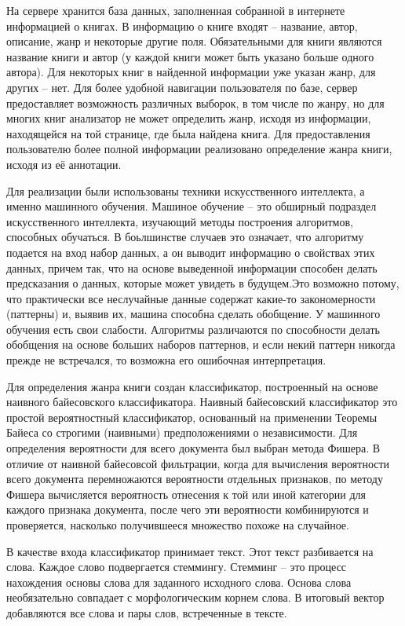 \documentclass[a4paper]{report}
\begin{document}
На сервере хранится база данных, заполненная собранной в интернете информацией о книгах. В информацию о книге входят -- название, автор, описание, жанр и некоторые другие поля. Обязательными для книги являются название книги и автор (у каждой книги может быть указано больше одного автора). Для некоторых книг в найденной информации уже указан жанр, для других -- нет. Для более удобной навигации пользователя по базе, сервер предоставляет возможность различных выборок, в том числе по жанру, но для многих книг анализатор не может определить жанр, исходя из информации, находящейся на той странице, где была найдена книга. Для предоставления пользователю более полной информации реализовано определение жанра книги, исходя из её аннотации. 

Для реализации были использованы техники искусственного интеллекта, а именно машинного обучения. Машиное обучение -- это обширный подраздел искусственного интеллекта, изучающий методы построения алгоритмов, способных обучаться. В боьлшинстве случаев это означает, что алгоритму подается на вход набор данных, а он выводит информацию о свойствах этих данных, причем так, что на основе выведенной информации способен делать предсказания о данных, которые может увидеть в будущем.Это возможно потому, что практически все неслучайные данные содержат какие-то закономерности (паттерны) и, выявив их, машина способна сделать обобщение. У машинного обучения есть свои слабости. Алгоритмы различаются по способности делать обобщения на основе больших наборов паттернов, и если некий паттерн никогда прежде не встречался, то возможна его ошибочная интерпретация.

Для определения жанра книги создан классификатор, построенный на основе наивного байесовского классификатора. Наивный байесовский классификатор это простой вероятностный классификатор, основанный на применении Теоремы Байеса со строгими (наивными) предположениями о независимости. Для определения вероятности для всего документа был выбран метода Фишера. 
В отличие от наивной байесовсой фильтрации, когда для вычисления вероятности всего документа перемножаются вероятности отдельных признаков, по методу Фишера вычисляется вероятность отнесения к той или иной категории для каждого признака документа, после чего эти вероятности комбинируются и проверяется, насколько получившееся множество похоже на случайное.

В качестве входа классификатор принимает текст. Этот текст разбивается на слова. Каждое слово подвергается стеммингу. Стемминг -- это процесс нахождения основы слова для заданного исходного слова. Основа слова необязательно совпадает с морфологическим корнем слова. В итоговый вектор добавляются все слова и пары слов, встреченные в тексте.
\end{document}
